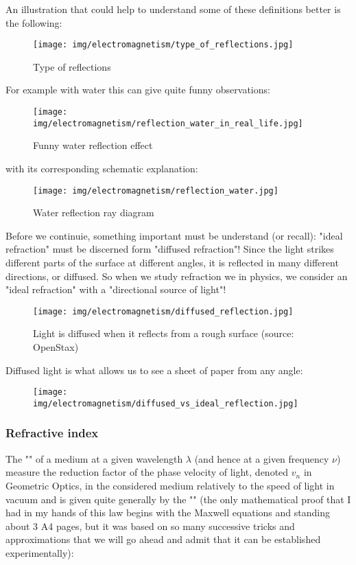 	An illustration that could help to understand some of these definitions better is the following:
	\begin{figure}[H]
		\centering
		\texttt{[image: img/electromagnetism/type\_of\_reflections.jpg]}
		\caption{Type of reflections}
	\end{figure}
	For example with water this can give quite funny observations:
	\begin{figure}[H]
		\centering
		\texttt{[image: img/electromagnetism/reflection\_water\_in\_real\_life.jpg]}
		\caption{Funny water reflection effect}
	\end{figure}
	with its corresponding schematic explanation:
	\begin{figure}[H]
		\centering
		\texttt{[image: img/electromagnetism/reflection\_water.jpg]}
		\caption{Water reflection ray diagram}
	\end{figure}
	Before we continuie, something important must be understand (or recall): "ideal refraction" must be discerned form "diffused refraction"! Since the light strikes different parts of the surface at different angles, it is reflected in many different directions, or diffused. So when we study refraction we in physics, we consider an "ideal refraction" with a "directional source of light"!
	\begin{figure}[H]
		\centering
		\texttt{[image: img/electromagnetism/diffused\_reflection.jpg]}
		\caption{Light is diffused when it reflects from a rough surface (source: OpenStax)}
	\end{figure}
	Diffused light is what allows us to see a sheet of paper from any angle:
	\begin{figure}[H]
		\centering
		\texttt{[image: img/electromagnetism/diffused\_vs\_ideal\_reflection.jpg]}
	\end{figure}
	
	\pagebreak
	\subsubsection{Refractive index}
	The "" of a medium at a given wavelength $\lambda$ (and hence at a given frequency $\nu$) measure the reduction factor of the phase velocity of light, denoted $v_n$ in Geometric Optics, in the considered medium relatively to the speed of light in vacuum  and is given quite generally by the "" (the only mathematical proof that I had in my hands of this law begins with the Maxwell equations and standing about $3$ A4 pages, but it was based on so many successive tricks and approximations that we will go ahead and admit that it can be established experimentally):
	
